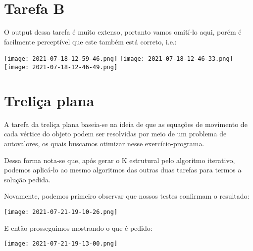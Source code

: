 \documentclass[
	12pt,				%
	openright,			%
	twoside,			%
	a4paper,			%
	]{abntex2}
\begin{document}
\section{Tarefa B}

O output dessa tarefa é muito extenso, portanto vamos omití-lo aqui, porém é
facilmente perceptível que este também está correto, i.e.:
\begin{center}
	\texttt{[image: 2021-07-18-12-59-46.png]}
	\texttt{[image: 2021-07-18-12-46-33.png]}
	\texttt{[image: 2021-07-18-12-46-49.png]}
\end{center}


\section{Treliça plana}

A tarefa da treliça plana baseia-se na ideia de que as equações de movimento de
cada vértice do objeto podem ser resolvidas por meio de um problema de
autovalores, os quais buscamos otimizar nesse exercício-programa.

Dessa forma nota-se que, após gerar o K estrutural pelo algoritmo iterativo,
podemos aplicá-lo ao mesmo algoritmos das outras duas tarefas para termos a
solução pedida.

Novamente, podemos primeiro observar que nossos testes confirmam o resultado:
\begin{center}
	\texttt{[image: 2021-07-21-19-10-26.png]}
\end{center}

E então prosseguimos mostrando o que é pedido:

\begin{center}
	\texttt{[image: 2021-07-21-19-13-00.png]}
\end{center}

\postextual

%

%
%

\end{document}

